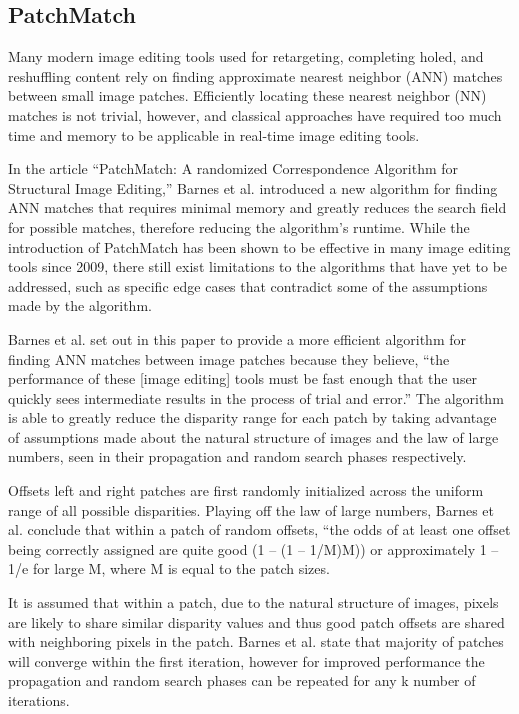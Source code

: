 \documentclass{article}
\begin{document}
\subsection{PatchMatch}
Many modern image editing tools used for retargeting, completing holed, and reshuffling content rely on finding approximate nearest neighbor (ANN) matches between small image patches. Efficiently locating these nearest neighbor (NN) matches is not trivial, however, and classical approaches have required too much time and memory to be applicable in real-time image editing tools.

In the article “PatchMatch: A randomized Correspondence Algorithm for Structural Image Editing,” Barnes et al. \citep{barnes2009patchmatch} introduced a new algorithm for finding ANN matches that requires minimal memory and greatly reduces the search field for possible matches, therefore reducing the algorithm’s runtime. While the introduction of PatchMatch has been shown to be effective in many image editing tools since 2009, there still exist limitations to the algorithms that have yet to be addressed, such as specific edge cases that contradict some of the assumptions made by the algorithm.

Barnes et al. \citep{barnes2009patchmatch} set out in this paper to provide a more efficient algorithm for finding ANN matches between image patches because they believe, “the performance of these [image editing] tools must be fast enough that the user quickly sees intermediate results in the process of trial and error.” The algorithm is able to greatly reduce the disparity range for each patch by taking advantage of assumptions made about the natural structure of images and the law of large numbers, seen in their propagation and random search phases respectively.

Offsets left and right patches are first randomly initialized across the uniform range of all possible disparities. Playing off the law of large numbers, Barnes et al. \citep{barnes2009patchmatch} conclude that within a patch of random offsets, “the odds of at least one offset being correctly assigned are quite good (1 – (1 – 1/M)M)) or approximately 1 – 1/e for large M, where M is equal to the patch sizes.

It is assumed that within a patch, due to the natural structure of images, pixels are likely to share similar disparity values and thus good patch offsets are shared with neighboring pixels in the patch. Barnes et al. \citep{barnes2009patchmatch} state that majority of patches will converge within the first iteration, however for improved performance the propagation and random search phases can be repeated for any k number of iterations.
\end{document}

